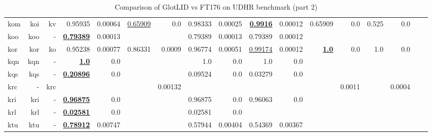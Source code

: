 \documentclass[11pt]{article}
\def\udhr{UDHR\xspace}
\def\ft176{FT176\xspace}
\begin{document}
\begin{table*}[h]
{\begin{tabular}{lrrrrrrrrrrrrrrrr}
kom         & koi         & kv         & 0.95935         & 0.00064         & \underline{0.65909}         & 0.0         & 0.98333         & 0.00025         & \textbf{\underline{0.9916}}         & 0.00012         & 0.65909         & 0.0         & 0.525         & 0.0         \\
koo         & koo         & -         & \textbf{\underline{0.79389}}         & 0.00013         &          &          & 0.79389         & 0.00013         & 0.79389         & 0.00012         &          &          &          &          \\
kor         & kor         & ko         & 0.95238         & 0.00077         & 0.86331         & 0.0009         & 0.96774         & 0.00051         & \underline{0.99174}         & 0.00012         & \textbf{\underline{1.0}}         & 0.0         & 1.0         & 0.0         \\
kqn         & kqn         & -         & \textbf{\underline{1.0}}         & 0.0         &          &          & 1.0         & 0.0         & 1.0         & 0.0         &          &          &          &          \\
kqs         & kqs         & -         & \textbf{\underline{0.20896}}         & 0.0         &          &          & 0.09524         & 0.0         & 0.03279         & 0.0         &          &          &          &          \\
krc         & -         & krc         &          &          &          & 0.00132         &          &          &          &          &          & 0.0011         &          & 0.0004         \\
kri         & kri         & -         & \textbf{\underline{0.96875}}         & 0.0         &          &          & 0.96875         & 0.0         & 0.96063         & 0.0         &          &          &          &          \\
krl         & krl         & -         & \textbf{\underline{0.02581}}         & 0.0         &          &          & 0.02581         & 0.0         &          &          &          &          &          &          \\
ktu         & ktu         & -         & \textbf{\underline{0.78912}}         & 0.00747         &          &          & 0.57944         & 0.00404         & 0.54369         & 0.00367         &          &          &          &          \\
\end{tabular}
}
\caption{Comparison of GlotLID vs \ft176 on \udhr benchmark (part 2)}
\label{tab:appendix_glotlid_ft176_udhr_2}
\end{table*}
\end{document}
